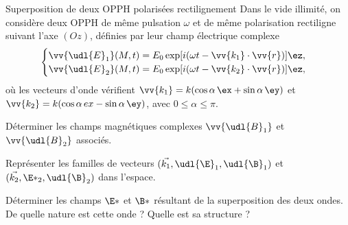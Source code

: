 \begin{exo}[PC][2][TD]{Superposition de deux OPPH polarisées rectilignement}
Dans le vide illimité, on considère deux OPPH de même pulsation $\omega$ et de même polarisation rectiligne suivant l'axe $(Oz)$, définies par leur champ électrique complexe
\begin{equation*}
\begin{cases}
\vv{\udl{E}_1}(M,t)=E_0\exp[i(\omega t-\vv{k_1}\cdot\vv{r})]\ez,\\
\vv{\udl{E}_2}(M,t)=E_0\exp[i(\omega t-\vv{k_2}\cdot\vv{r})]\ez,
\end{cases}
\end{equation*}
où les vecteurs d'onde vérifient $\vv{k_1} = k (\cos \alpha\, \ex + \sin \alpha \,\ey)$ et $\vv{k_2} = k (\cos \alpha \,ex - \sin \alpha \,\ey)$, avec $0 \leq \alpha \leq \pi$.
\begin{quest}
\item Déterminer les champs magnétiques complexes $\vv{\udl{B}_1}$ et $\vv{\udl{B}_2}$ associés.
\item Représenter les familles de vecteurs $(\Vec{k_1},\udl{\E}_1,\udl{\B}_1)$ et $(\Vec{k_2},\E*_2,\udl{\B}_2)$ dans l'espace.
\item Déterminer les champs $\E*$ et $\B*$ résultant de la superposition des deux ondes. De quelle nature est cette onde ? Quelle est sa structure ?
\end{quest}
\end{exo}

